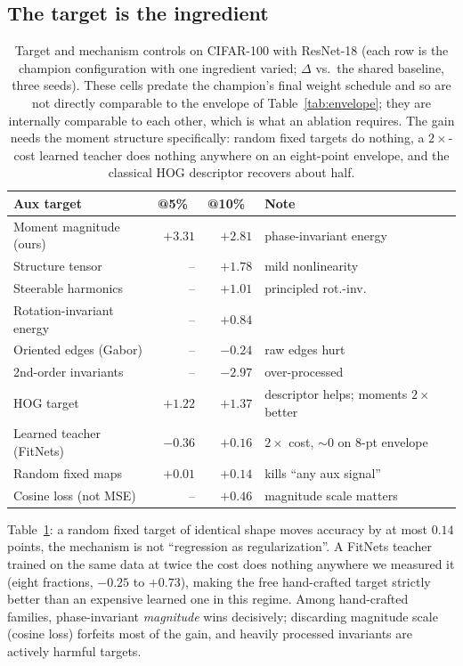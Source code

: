 \subsection{The target is the ingredient}\label{abl:target}
\begin{table}[t]
\caption{Target and mechanism controls on CIFAR-100 with ResNet-18 (each
row is the champion configuration with one ingredient varied; $\Delta$ vs.\
the shared baseline, three seeds). These cells predate the champion's final
weight schedule and so are not directly comparable to the envelope of
Table~\ref{tab:envelope}; they are internally comparable to each other,
which is what an ablation requires. The gain needs the moment structure specifically:
random fixed targets do nothing, a $2\times$-cost learned teacher does
nothing anywhere on an eight-point envelope, and the classical HOG
descriptor recovers about half.}
\label{tab:controls}
\centering\scriptsize
\setlength{\tabcolsep}{2.6pt}
\begin{tabular}{@{}P{0.33\columnwidth}rrP{0.31\columnwidth}@{}}
\toprule
Aux target & @5\%~\up & @10\%~\up & Note \\
\midrule
Moment magnitude (ours) & $+3.31$ & $+2.81$ & phase-invariant energy \\
Structure tensor &--& $+1.78$ & mild nonlinearity \\
Steerable harmonics &--& $+1.01$ & principled rot.-inv. \\
Rotation-invariant energy &--& $+0.84$ & \\
Oriented edges (Gabor) &--& $-0.24$ & raw edges hurt \\
2nd-order invariants &--& $-2.97$ & over-processed \\
\midrule
HOG target & $+1.22$ & $+1.37$ & descriptor helps; moments $2\times$ better \\
Learned teacher (FitNets) & $-0.36$ & $+0.16$ & $2\times$ cost, ${\sim}0$ on 8-pt envelope \\
Random fixed maps & $+0.01$ & $+0.14$ & kills ``any aux signal'' \\
\midrule
Cosine loss (not MSE) & -- & $+0.46$ & magnitude scale matters \\
\bottomrule
\end{tabular}
\end{table}

Table~\ref{tab:controls}: a random fixed target of identical shape moves
accuracy by at most $0.14$ points, the mechanism is not ``regression as
regularization''. A FitNets teacher trained on the same data at twice the
cost does nothing anywhere we measured it (eight fractions, $-0.25$ to
$+0.73$), making the free hand-crafted target strictly better than an
expensive learned one in this regime. Among hand-crafted families,
phase-invariant \emph{magnitude} wins decisively; discarding magnitude
scale (cosine loss) forfeits most of the gain, and heavily processed
invariants are actively harmful targets.

